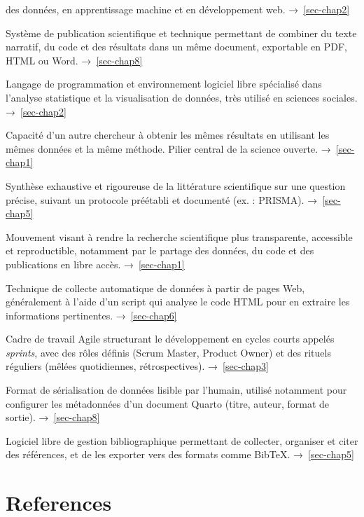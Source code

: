 \documentclass[
  letterpaper,
  DIV=11,
  numbers=noendperiod,
  oneside]{scrreprt}
\begin{document}
\begin{description}
des données, en apprentissage machine et en développement web.
→~\ref{sec-chap2}
\item[\textbf{Quarto}]
Système de publication scientifique et technique permettant de combiner
du texte narratif, du code et des résultats dans un même document,
exportable en PDF, HTML ou Word. →~\ref{sec-chap8}
\item[\textbf{R}]
Langage de programmation et environnement logiciel libre spécialisé dans
l'analyse statistique et la visualisation de données, très utilisé en
sciences sociales. →~\ref{sec-chap2}
\item[\textbf{Reproductibilité}]
Capacité d'un autre chercheur à obtenir les mêmes résultats en utilisant
les mêmes données et la même méthode. Pilier central de la science
ouverte. →~\ref{sec-chap1}
\item[\textbf{Revue systématique}]
Synthèse exhaustive et rigoureuse de la littérature scientifique sur une
question précise, suivant un protocole préétabli et documenté (ex. :
PRISMA). →~\ref{sec-chap5}
\item[\textbf{Science ouverte}]
Mouvement visant à rendre la recherche scientifique plus transparente,
accessible et reproductible, notamment par le partage des données, du
code et des publications en libre accès. →~\ref{sec-chap1}
\item[\textbf{Scraping web} \emph{(extraction automatisée)}]
Technique de collecte automatique de données à partir de pages Web,
généralement à l'aide d'un script qui analyse le code HTML pour en
extraire les informations pertinentes. →~\ref{sec-chap6}
\item[\textbf{Scrum}]
Cadre de travail Agile structurant le développement en cycles courts
appelés \emph{sprints}, avec des rôles définis (Scrum Master, Product
Owner) et des rituels réguliers (mêlées quotidiennes, rétrospectives).
→~\ref{sec-chap3}
\item[\textbf{YAML} \emph{(YAML Ain't Markup Language)}]
Format de sérialisation de données lisible par l'humain, utilisé
notamment pour configurer les métadonnées d'un document Quarto (titre,
auteur, format de sortie). →~\ref{sec-chap8}
\item[\textbf{Zotero}]
Logiciel libre de gestion bibliographique permettant de collecter,
organiser et citer des références, et de les exporter vers des formats
comme BibTeX. →~\ref{sec-chap5}
\end{description}

\hypertarget{references}{%
\chapter*{References}\label{references}}
\end{document}

